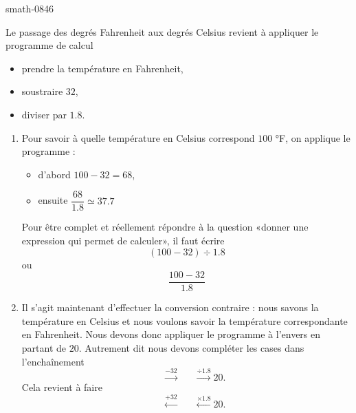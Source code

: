 
\begin{corrige}{smath-0846}

    Le passage des degrés Fahrenheit aux degrés Celsius revient à appliquer le programme de calcul
    \begin{itemize}
        \item prendre la température en Fahrenheit,
        \item soustraire \( 32\),
        \item diviser par \( 1.8\).
    \end{itemize}
    \begin{enumerate}
        \item
            Pour savoir à quelle température en Celsius correspond \( 100 \) °F, on applique le programme :
            \begin{itemize}
                \item d'abord \( 100-32=68\),
                \item ensuite \( \dfrac{ 68 }{ 1.8 }\simeq 37.7\)
            \end{itemize}
            Pour être complet et réellement répondre à la question «donner une expression qui permet de calculer», il faut écrire
            \begin{equation}
                (100-32)\div 1.8
            \end{equation}
            ou
            \begin{equation}
                \frac{ 100-32 }{ 1.8 }
            \end{equation}
        \item 
            Il s'agit maintenant d'effectuer la conversion contraire : nous savons la température en Celsius et nous voulons savoir la température correspondante en Fahrenheit. Nous devons donc appliquer le programme à l'envers en partant de \( 20\). Autrement dit nous devons compléter les cases dans l'enchaînement
            \begin{equation}
                \boxed{\phantom{301}}\stackrel{-32}{\longrightarrow}\boxed{\phantom{301}}\stackrel{\div 1.8}{\longrightarrow}\boxed{20}.
            \end{equation}
            Cela revient à faire
            \begin{equation}
                \boxed{\phantom{301}}\stackrel{+32}{\longleftarrow}\boxed{\phantom{301}}\stackrel{\times 1.8}{\longleftarrow}\boxed{20}.

\end{equation}
\end{enumerate}
\end{corrige}
